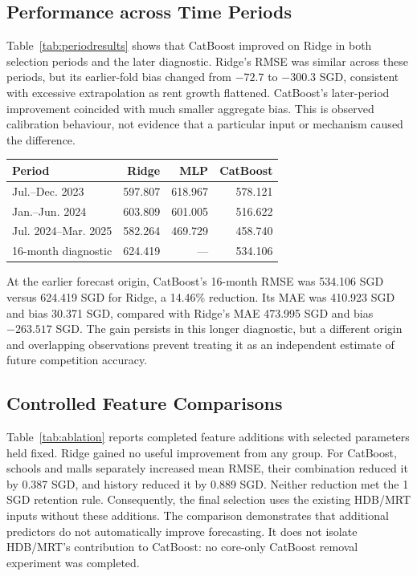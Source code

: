 \documentclass[conference]{IEEEtran}
\makeatletter
\newenvironment{localtable}{\par\addvspace{\medskipamount}\noindent
  \begin{minipage}{\columnwidth}\def\@captype{table}}{\end{minipage}\par
  \addvspace{\medskipamount}}
\makeatother
\begin{document}
\subsection{Performance across Time Periods}
Table~\ref{tab:periodresults} shows that CatBoost improved on Ridge in both
selection periods and the later diagnostic. Ridge's RMSE was similar across
these periods, but its earlier-fold bias changed from $-72.7$ to $-300.3$
SGD, consistent with excessive extrapolation as rent growth flattened.
CatBoost's later-period improvement coincided with much smaller aggregate
bias. This is observed calibration behaviour, not evidence that a particular
input or mechanism caused the difference.

\begin{localtable}
  \caption{RMSE (SGD) by evaluation period. The final row overlaps the others.}
  \label{tab:periodresults}
  \centering\small
  \begin{tabularx}{\columnwidth}{Xrrr}
    \toprule
    Period & Ridge & MLP & CatBoost \\
    \midrule
    Jul.--Dec. 2023 & 597.807 & 618.967 & 578.121 \\
    Jan.--Jun. 2024 & 603.809 & 601.005 & 516.622 \\
    Jul. 2024--Mar. 2025 & 582.264 & 469.729 & 458.740 \\
    16-month diagnostic & 624.419 & --- & 534.106 \\
    \bottomrule
  \end{tabularx}
\end{localtable}

At the earlier forecast origin, CatBoost's 16-month RMSE was 534.106 SGD
versus 624.419 SGD for Ridge, a 14.46\% reduction. Its MAE was 410.923 SGD
and bias 30.371 SGD, compared with Ridge's MAE 473.995 SGD and bias
$-263.517$ SGD. The gain persists in this longer diagnostic, but a different
origin and overlapping observations prevent treating it as an independent
estimate of future competition accuracy.

\subsection{Controlled Feature Comparisons}
\label{sec:ablation}
Table~\ref{tab:ablation} reports completed feature additions with selected
parameters held fixed. Ridge gained no useful improvement from any group.
For CatBoost, schools and malls separately increased mean RMSE, their
combination reduced it by 0.387 SGD, and history reduced it by 0.889 SGD.
Neither reduction met the 1 SGD retention rule. Consequently, the final
selection uses the existing HDB/MRT inputs without these additions. The
comparison demonstrates that additional predictors do not automatically
improve forecasting. It does not isolate HDB/MRT's contribution to CatBoost:
no core-only CatBoost removal experiment was completed.
\end{document}
